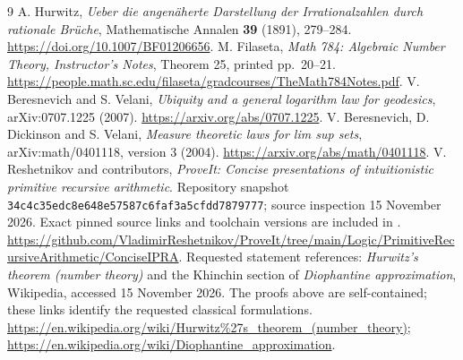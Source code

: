 \clearpage
\begin{thebibliography}{9}
A. Hurwitz, \emph{Ueber die angen\"aherte Darstellung der Irrationalzahlen
durch rationale Br\"uche}, Mathematische Annalen \textbf{39} (1891),
279--284. \url{https://doi.org/10.1007/BF01206656}.
M. Filaseta, \emph{Math 784: Algebraic Number Theory, Instructor's Notes},
Theorem 25, printed pp.~20--21.
\url{https://people.math.sc.edu/filaseta/gradcourses/TheMath784Notes.pdf}.
V. Beresnevich and S. Velani, \emph{Ubiquity and a general logarithm law
for geodesics}, arXiv:0707.1225 (2007).
\url{https://arxiv.org/abs/0707.1225}.
V. Beresnevich, D. Dickinson and S. Velani,
\emph{Measure theoretic laws for lim sup sets}, arXiv:math/0401118,
version 3 (2004). \url{https://arxiv.org/abs/math/0401118}.
V. Reshetnikov and contributors, \emph{ProveIt: Concise presentations of
intuitionistic primitive recursive arithmetic}. Repository snapshot
\texttt{34c4c35edc8e648e57587c6faf3a5cfdd7879777}; source inspection
15 November 2026. Exact pinned source links and toolchain versions are
included in .
\url{https://github.com/VladimirReshetnikov/ProveIt/tree/main/Logic/PrimitiveRecursiveArithmetic/ConciseIPRA}.
Requested statement references: \emph{Hurwitz's theorem (number theory)}
and the Khinchin section of \emph{Diophantine approximation}, Wikipedia,
accessed 15 November 2026. The proofs above are self-contained;
these links identify the requested classical formulations.
\url{https://en.wikipedia.org/wiki/Hurwitz\%27s_theorem_(number_theory)};
\url{https://en.wikipedia.org/wiki/Diophantine_approximation}.
\end{thebibliography}
